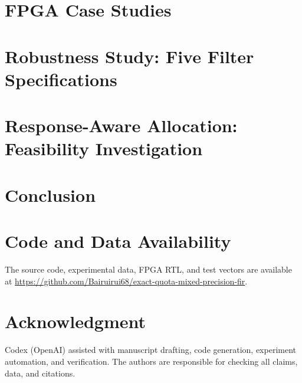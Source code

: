 \documentclass[journal]{IEEEtran}
\begin{document}


\section{FPGA Case Studies}
\label{sec:fpga}



\section{Robustness Study: Five Filter Specifications}
\label{sec:robustness}



\section{Response-Aware Allocation: Feasibility Investigation}
\label{sec:response_aware}



\section{Conclusion}
\label{sec:conclusion}



\section*{Code and Data Availability}
The source code, experimental data, FPGA RTL, and test vectors are available at
\url{https://github.com/Bairuirui68/exact-quota-mixed-precision-fir}.

\section*{Acknowledgment}
Codex (OpenAI) assisted with manuscript drafting, code generation,
experiment automation, and verification. The authors are responsible
for checking all claims, data, and citations.



\end{document}
